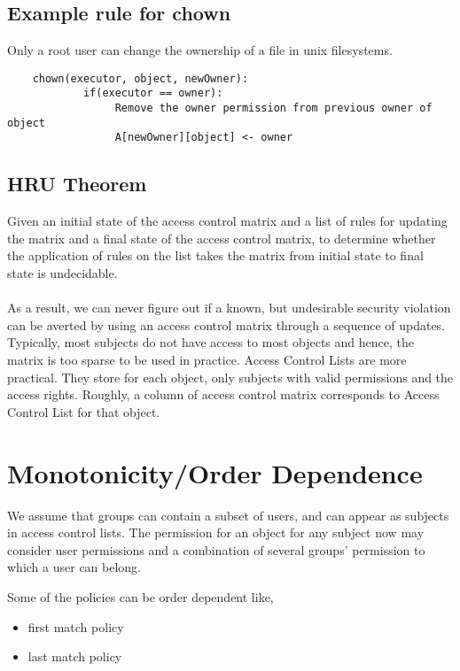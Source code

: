 \documentclass[11pt]{article} %
\begin{document}
\subsection{Example rule for chown}
Only a root user can change the ownership of a file in unix filesystems.

\begin{verbatim}
    chown(executor, object, newOwner):
            if(executor == owner):
                 Remove the owner permission from previous owner of object
                 A[newOwner][object] <- owner
\end{verbatim}
\subsection{HRU Theorem}
Given an initial state of the access control matrix and a list of rules for updating the
 matrix and a final state of the access control matrix, to determine whether the application
of rules on the list takes the matrix from  initial state to final state is undecidable.\\
\\
As a result, we can never figure out if a known, but undesirable security violation can be
averted by using an access control matrix through a sequence of updates. Typically,
most subjects do not have access to most objects and hence, the matrix is too sparse to
be used in practice. Access Control Lists are more practical. They store for each object,
only subjects with valid permissions and the access rights. Roughly, a column of access
control matrix corresponds to Access Control List for that object.

\section{Monotonicity/Order Dependence}
We assume that groups can contain a subset of users, and can appear as subjects in
access control lists. The permission for an object for any subject now may consider
user permissions and a combination of several groups' permission to which a user can 
belong.

Some of the policies can be order dependent like,

\begin{itemize} \itemsep -2pt  %
\item first match policy
\item last match policy
\end{itemize}
\end{document}
